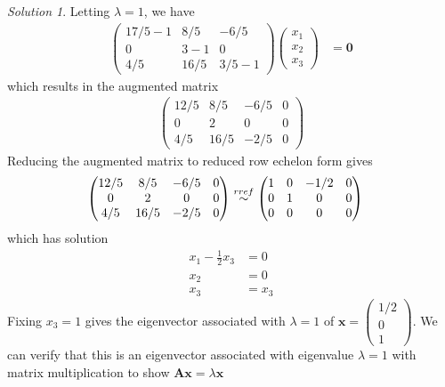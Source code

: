 \documentclass[
]{book}
\theoremstyle{definition}
\theoremstyle{definition}
\theoremstyle{definition}
\theoremstyle{definition}
\theoremstyle{remark}
\newtheorem*{solution}{Solution}
\begin{document}
\begin{solution}
Letting \(\lambda = 1\), we have
\[
\begin{aligned}
\begin{pmatrix} 
17/5  - 1 & 8/5 & -6/5 \\
0 & 3 - 1 & 0 \\
4/5 & 16/5 & 3/5 - 1
\end{pmatrix} \begin{pmatrix} x_1 \\ x_2 \\ x_3 \end{pmatrix} & = \mathbf{0}
\end{aligned}
\]
which results in the augmented matrix
\[
\begin{aligned}
\begin{pmatrix} 12/5 & 8/5 & -6/5 & 0 \\ 0 & 2 & 0 & 0 \\ 4/5 & 16/5 & -2/5 & 0 \end{pmatrix}
\end{aligned}
\]
Reducing the augmented matrix to reduced row echelon form gives
\[
\begin{aligned}
\begin{pmatrix} 12/5 & 8/5 & -6/5 & 0 \\ 0 & 2 & 0 & 0 \\ 4/5 & 16/5 & -2/5 & 0 \end{pmatrix} & \stackrel{rref}{\huge \sim} \begin{pmatrix} 1 & 0 & -1/2 & 0 \\ 0 & 1 & 0 & 0 \\ 0 & 0 & 0 & 0 \end{pmatrix}
\end{aligned}
\]
which has solution
\[
\begin{aligned}
x_1 - \frac{1}{2} x_3 & = 0 \\
x_2  & = 0 \\
x_3 & = x_3
\end{aligned}
\]
Fixing \(x_3 = 1\) gives the eigenvector associated with \(\lambda= 1\) of \(\mathbf{x} = \begin{pmatrix} 1/2 \\ 0 \\ 1 \end{pmatrix}\). We can verify that this is an eigenvector associated with eigenvalue \(\lambda = 1\) with matrix multiplication to show \(\mathbf{A} \mathbf{x} = \lambda \mathbf{x}\)
\[
\begin{aligned}

\end{aligned}\]
\end{solution}
\end{document}
